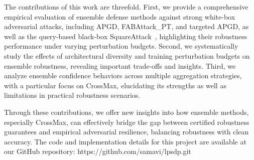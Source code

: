 The contributions of this work are threefold. First, we provide a comprehensive empirical evaluation of ensemble defense methods against strong white-box adversarial attacks, including APGD, FABAttack\_PT, and targeted APGD, as well as the query-based black-box SquareAttack~\cite{croce2020reliable}, highlighting their robustness performance under varying perturbation budgets. Second, we systematically study the effects of architectural diversity and training perturbation budgets on ensemble robustness, revealing important trade-offs and insights. Third, we analyze ensemble confidence behaviors across multiple aggregation strategies, with a particular focus on CrossMax, elucidating its strengths as well as limitations in practical robustness scenarios.

Through these contributions, we offer new insights into how ensemble methods, especially CrossMax, can effectively bridge the gap between certified robustness guarantees and empirical adversarial resilience, balancing robustness with clean accuracy. The code and implementation details for this project are available at our GitHub repository: https://github.com/samavi/lpsdp.git
